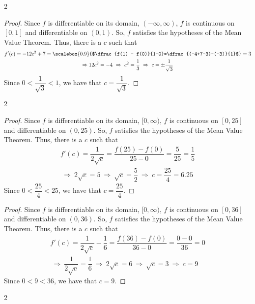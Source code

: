 \documentclass{book}
\begin{document}
\begin{appendices}
\begin{enumerate}[!HW!]
\begin{multicols}{2}
\item \mbox{}\vspace{-25pt}

\begin{proof}
Since $f$ is differentiable on its domain, $(-\infty, \infty)$, $f$ is continuous on $[0,1]$ and differentiable on $(0,1)$. So, $f$ satisfies the hypotheses of the Mean Value Theorem. Thus, there is a $c$ such that 
\begin{multline*}
f'(c) = -12c^2+7 = \scalebox{0.9}{$\dfrac{f(1) - f(0)}{1-0}=\dfrac{(-4+7-3)-(-3)}{1}$} = 3\\ \Rightarrow\-12c^2 = -4
\ \Rightarrow\ c^2 = \dfrac{1}{3}\ \Rightarrow\ c= \pm \dfrac{1}{\sqrt{3}}
\end{multline*} Since $0 < \dfrac{1}{\sqrt{3}} < 1$, we have that $c= \dfrac{1}{\sqrt{3}}$.
\end{proof}
\end{multicols}
\begin{multicols}{2}
\itemspade \mbox{}\vspace{-25pt}

\begin{proof}
Since $f$ is differentiable on its domain, $[0, \infty)$, $f$ is continuous on $[0,25]$ and differentiable on $(0,25)$. So, $f$ satisfies the hypotheses of the Mean Value Theorem. Thus, there is a $c$ such that 
\begin{multline*}
f'(c)=\dfrac{1}{2\sqrt{c}} = \dfrac{f(25) - f(0)}{25-0}=\dfrac{5}{25} = \dfrac{1}{5}\\
\ \Rightarrow\ 2\sqrt{c} = 5\ \Rightarrow\ \sqrt{c}= \dfrac{5}{2}\ \Rightarrow\ c= \dfrac{25}{4} = 6.25
\end{multline*} Since $0 < \dfrac{25}{4} < 25$, we have that $c= \dfrac{25}{4}$.
\end{proof}\columnbreak

\itemspade \mbox{}\vspace{-25pt}

\begin{proof}
Since $f$ is differentiable on its domain, $[0, \infty)$, $f$ is continuous on $[0,36]$ and differentiable on $(0,36)$. So, $f$ satisfies the hypotheses of the Mean Value Theorem. Thus, there is a $c$ such that 
\begin{multline*}
f'(c) = \dfrac{1}{2\sqrt{c}}-\dfrac{1}{6} = \dfrac{f(36) - f(0)}{36-0}=\dfrac{0-0}{36} = 0\\
\ \Rightarrow\ \dfrac{1}{2\sqrt{c}} = \dfrac{1}{6} \ \Rightarrow\ 2\sqrt{c} = 6 \ \Rightarrow\ \sqrt{c}= 3 \ \Rightarrow\ c= 9
\end{multline*} Since $0 < 9 < 36$, we have that $c= 9$.
\end{proof}
\end{multicols}
\begin{multicols}{2}
\itemspade \mbox{}\vspace{-25pt}


\end{multicols}
\end{enumerate}
\end{appendices}
\end{document}
